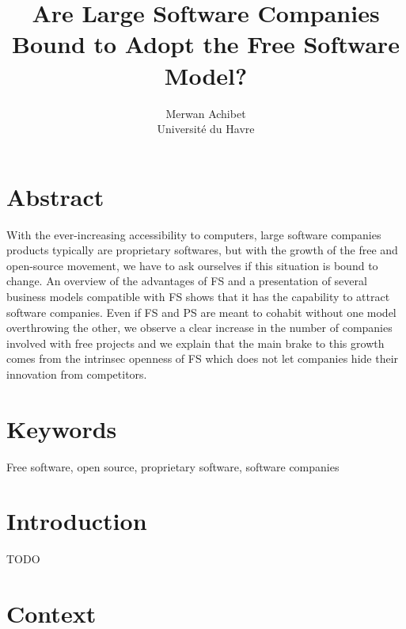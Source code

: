 \documentclass[12pt]{article}
\title{Are Large Software Companies Bound to Adopt the Free Software Model?}
\author{Merwan Achibet\\Université du Havre}
\date{}
\begin{document}
\maketitle
\newpage

\tableofcontents
\newpage

\section*{Abstract}

With the ever-increasing accessibility to computers, large software companies products typically are
proprietary softwares, but with the growth of the free and open-source movement,
we have to ask ourselves if this situation is bound to change. An overview of the advantages of FS and a presentation of several business models compatible with FS shows that it has the capability to attract software companies. Even if FS and PS are meant to cohabit without one model overthrowing the other, we observe a clear increase in the number of companies involved with free projects and we explain that the main brake to this growth comes from the intrinsec  openness of FS which does not let companies hide their innovation from competitors.

\section*{Keywords}

Free software, open source, proprietary software, software companies

\newpage

\section*{Introduction}

TODO

\section{Context}
\end{document}

